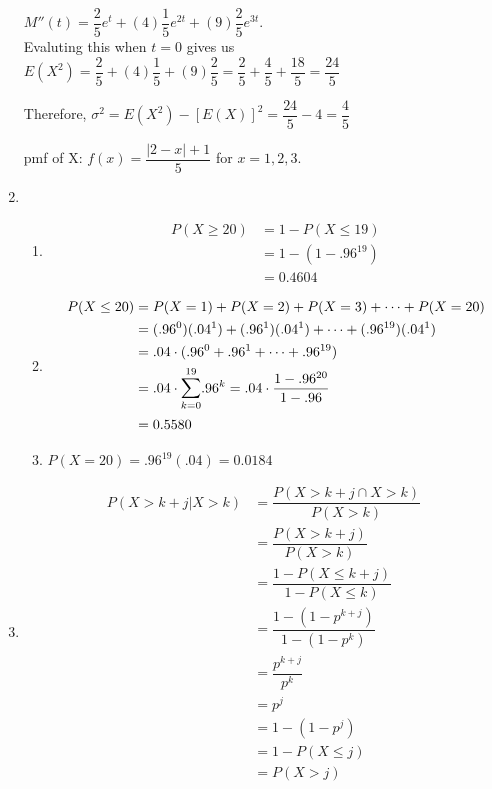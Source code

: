 \documentclass{article}
\begin{document}
\begin{enumerate}
	$M''(t) = \dfrac{2}{5}e^t + (4)\dfrac{1}{5}e^{2t} + (9)\dfrac{2}{5}e^{3t}$. \\
	Evaluting this when $t = 0$ gives us $E(X^2) = \dfrac{2}{5} + (4)\dfrac{1}{5} + (9)\dfrac{2}{5} 
	  = \dfrac{2}{5} + \dfrac{4}{5} + \dfrac{18}{5} = \dfrac{24}{5}$
	
	Therefore, $\sigma^2 = E(X^2) - [E(X)]^2 = \dfrac{24}{5} - 4 = \dfrac{4}{5}$
	
      
	pmf of X: $f(x) = \dfrac{|2 - x| + 1}{5}$ for $x = 1,2,3$.
      
      \addtocounter{enumi}{3}
	
      \item
	\begin{enumerate}
	 \item 
	  \begin{align*}
	   P(X \ge 20) &= 1 - P(X \le 19) \\
	      &= 1 - (1 - .96^{19}) \\
	      &= 0.4604
	  \end{align*}
	 
	 \item
	  \begin{align*}
	   P(X \le 20) &= P(X=1) + P(X=2) + P(X=3) + \cdots + P(X=20) \\
	      &= (.96^0)(.04^1) + (.96^1)(.04^1) + \cdots + (.96^{19})(.04^1) \\
	      &= .04 \cdot (.96^0 + .96^1 + \cdots + .96^{19}) \\
	      &= .04 \cdot \mathlarger{\sum}_{k=0}^{19}{.96^k} = .04 \cdot \dfrac{1-.96^{20}}{1-.96} \\
	      &= 0.5580
	  \end{align*}
	 
	 \item
	  $P(X=20) = .96^{19}(.04) = 0.0184$
	\end{enumerate}
      \addtocounter{enumi}{2}
      
      \item
	\begin{align*}
	 P(X > k+j | X > k) &= \dfrac{P(X > k+j \cap X > k)}{P(X > k)} \\
	    &= \dfrac{P(X > k+j)}{P(X > k)} \\
	    &= \dfrac{1 - P(X \le k + j)}{1 - P(X \le k)} \\
	    &= \dfrac{1 - (1 - p^{k+j})}{1 - (1 - p^k)} \\
	    &= \dfrac{p^{k+j}}{p^k} \\
	    &= p^j \\
	    &= 1 - (1 - p^j) \\
	    &= 1 - P(X \le j) \\
	    &= P(X > j)
	\end{align*}
    \end{enumerate}
    
\end{document}
